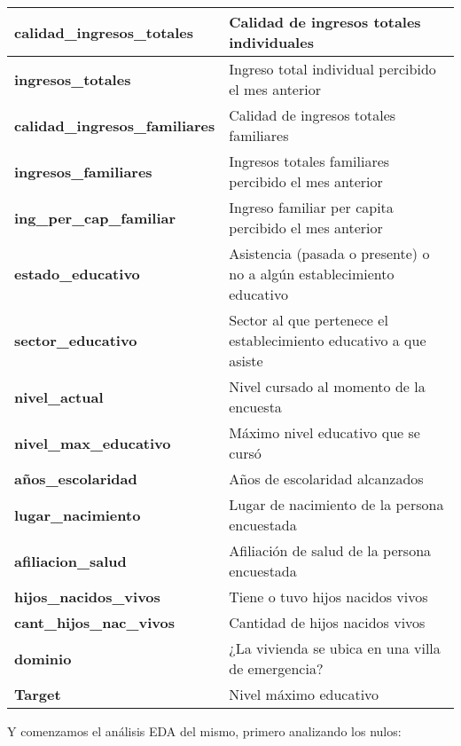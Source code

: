 \documentclass[a4paper]{article}
\begin{document}
\begin{table}[H]
\begin{tabular}{|l|l|}
        \textbf{calidad\_ingresos\_totales}    & Calidad de ingresos totales individuales \\ \hline
        \textbf{ingresos\_totales}             & Ingreso total individual percibido el mes anterior \\ \hline
        \textbf{calidad\_ingresos\_familiares} & Calidad de ingresos totales familiares \\ \hline
        \textbf{ingresos\_familiares}          & Ingresos totales familiares percibido el mes anterior \\ \hline
        \textbf{ing\_per\_cap\_familiar}       & Ingreso familiar per capita percibido el mes anterior \\ \hline
        \textbf{estado\_educativo}             & Asistencia (pasada o presente) o no a algún establecimiento educativo \\ \hline
        \textbf{sector\_educativo}             & Sector al que pertenece el establecimiento educativo a que asiste \\ \hline
        \textbf{nivel\_actual}                 & Nivel cursado al momento de la encuesta \\ \hline
        \textbf{nivel\_max\_educativo}         & Máximo nivel educativo que se cursó \\ \hline
        \textbf{años\_escolaridad}             & Años de escolaridad alcanzados \\ \hline
        \textbf{lugar\_nacimiento}             & Lugar de nacimiento de la persona encuestada \\ \hline
        \textbf{afiliacion\_salud}             & Afiliación de salud de la persona encuestada \\ \hline
        \textbf{hijos\_nacidos\_vivos}         & Tiene o tuvo hijos nacidos vivos \\ \hline
        \textbf{cant\_hijos\_nac\_vivos}       & Cantidad de hijos nacidos vivos \\ \hline
        \textbf{dominio}                       & ¿La vivienda se ubica en una villa de emergencia? \\ \hline
        \textbf{Target}                        & Nivel máximo educativo \\ \hline
    \end{tabular}
    \end{table}
 
    \newpage

    Y comenzamos el análisis EDA del mismo, primero analizando los nulos:
\end{document}
